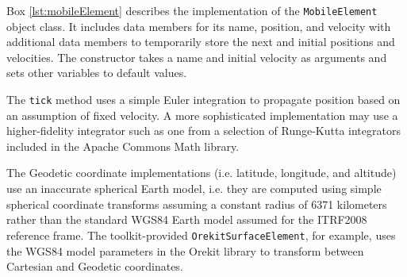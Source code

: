 \documentclass[]{article}
\begin{document}
Box \ref{lst:mobileElement} describes the implementation of the \texttt{MobileElement} object class. It includes data members for its name, position, and velocity with additional data members to temporarily store the next and initial positions and velocities. The constructor takes a name and initial velocity as arguments and sets other variables to default values.

The \texttt{tick} method uses a simple Euler integration to propagate position based on an assumption of fixed velocity. A more sophisticated implementation may use a higher-fidelity integrator such as one from a selection of Runge-Kutta integrators included in the Apache Commons Math library.

The Geodetic coordinate implementations (i.e. latitude, longitude, and altitude) use an inaccurate spherical Earth model, i.e. they are computed using simple spherical coordinate transforms assuming a constant radius of 6371 kilometers rather than the standard WGS84 Earth model assumed for the ITRF2008 reference frame. The toolkit-provided \texttt{OrekitSurfaceElement}, for example, uses the WGS84 model parameters in the Orekit library to transform between Cartesian and Geodetic coordinates.
\end{document}
